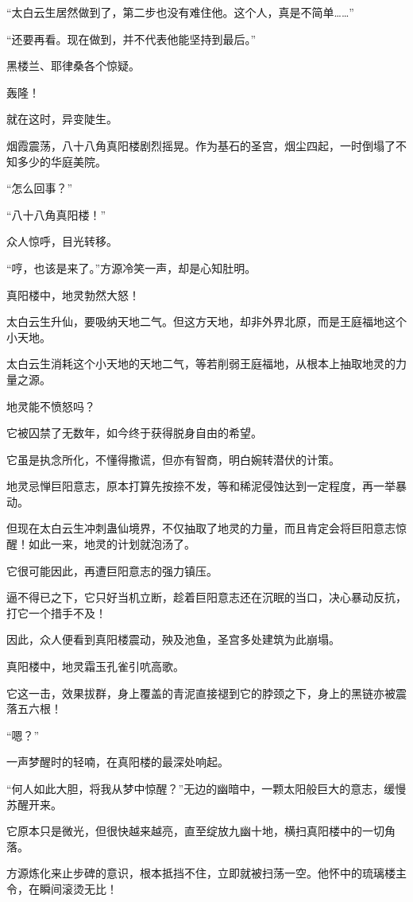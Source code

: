 \begin{this_body}
“太白云生居然做到了，第二步也没有难住他。这个人，真是不简单……”

“还要再看。现在做到，并不代表他能坚持到最后。”

黑楼兰、耶律桑各个惊疑。

轰隆！

就在这时，异变陡生。

烟霞震荡，八十八角真阳楼剧烈摇晃。作为基石的圣宫，烟尘四起，一时倒塌了不知多少的华庭美院。

“怎么回事？”

“八十八角真阳楼！”

众人惊呼，目光转移。

“哼，也该是来了。”方源冷笑一声，却是心知肚明。

真阳楼中，地灵勃然大怒！

太白云生升仙，要吸纳天地二气。但这方天地，却非外界北原，而是王庭福地这个小天地。

太白云生消耗这个小天地的天地二气，等若削弱王庭福地，从根本上抽取地灵的力量之源。

地灵能不愤怒吗？

它被囚禁了无数年，如今终于获得脱身自由的希望。

它虽是执念所化，不懂得撒谎，但亦有智商，明白婉转潜伏的计策。

地灵忌惮巨阳意志，原本打算先按捺不发，等和稀泥侵蚀达到一定程度，再一举暴动。

但现在太白云生冲刺蛊仙境界，不仅抽取了地灵的力量，而且肯定会将巨阳意志惊醒！如此一来，地灵的计划就泡汤了。

它很可能因此，再遭巨阳意志的强力镇压。

逼不得已之下，它只好当机立断，趁着巨阳意志还在沉眠的当口，决心暴动反抗，打它一个措手不及！

因此，众人便看到真阳楼震动，殃及池鱼，圣宫多处建筑为此崩塌。

真阳楼中，地灵霜玉孔雀引吭高歌。

它这一击，效果拔群，身上覆盖的青泥直接褪到它的脖颈之下，身上的黑链亦被震落五六根！

“嗯？”

一声梦醒时的轻喃，在真阳楼的最深处响起。

“何人如此大胆，将我从梦中惊醒？”无边的幽暗中，一颗太阳般巨大的意志，缓慢苏醒开来。

它原本只是微光，但很快越来越亮，直至绽放九幽十地，横扫真阳楼中的一切角落。

方源炼化来止步碑的意识，根本抵挡不住，立即就被扫荡一空。他怀中的琉璃楼主令，在瞬间滚烫无比！

\end{this_body}

